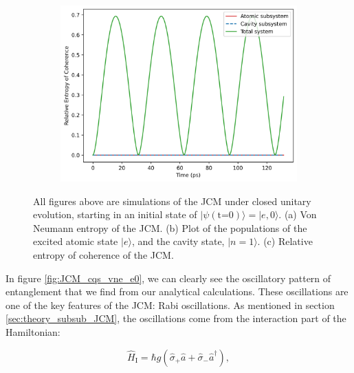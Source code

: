 \documentclass[12pt]{article}
\begin{document}
\begin{figure}[h]
    \begin{subfigure}{0.45\textwidth}
        \centering
        \includegraphics[width=\linewidth]{Research Project/Code/results/JCM/CQS_coh.png}
        \caption{}
        \label{fig:JCM_cqs_coh_e0}
    \end{subfigure}
    \hfill
    \caption{All figures above are simulations of the JCM under closed unitary evolution, starting in an initial state of $|\psi (\text{t=0})\rangle = |e, 0\rangle$. (a) Von Neumann entropy of the JCM. (b) Plot of the populations of the excited atomic state $|e\rangle$, and the cavity state, $|n=1\rangle$. (c) Relative entropy of coherence of the JCM.}
\end{figure}

In figure \ref{fig:JCM_cqs_vne_e0}, we can clearly see the oscillatory pattern of entanglement that we find from our analytical calculations. These oscillations are one of the key features of the JCM: Rabi oscillations. As mentioned in section \ref{sec:theory_subsub_JCM}, the oscillations come from the interaction part of the Hamiltonian:

\begin{equation*}
     \hat{H}_{\scriptscriptstyle \text{I}} = \hbar g(\hat{\sigma}_{+}\hat{a} +\hat{\sigma}_{-}\hat{a}^\dagger),
\end{equation*}
\end{document}
